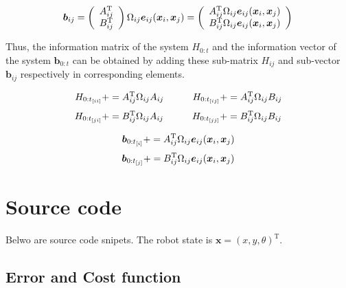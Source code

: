 \documentclass{article}
\begin{document}
\[
\bm{b}_{ij} =
\left(
  \begin{array}{cc}
    A_{ij}^{\mathrm{T}} \\
    B_{ij}^{\mathrm{T}} \\
  \end{array}
\right)
\Omega_{ij}
\bm{e}_{ij}(\bm{x}_i, \bm{x}_j)
=
\left(
  \begin{array}{cc}
    A_{ij}^{\mathrm{T}}\Omega_{ij}\bm{e}_{ij}(\bm{x}_i, \bm{x}_j) \\
    B_{ij}^{\mathrm{T}}\Omega_{ij}\bm{e}_{ij}(\bm{x}_i, \bm{x}_j) \\
  \end{array}
\right) \\
\]

Thus, the information matrix of the system $H_{0:t}$ and the information vector of the system $\bm{b}_{0:t}$ can be obtained by adding these sub-matrix $H_{ij}$ and sub-vector $\bm{b}_{ij}$ respectively in corresponding elements.

\[
H_{{0:t}_{[ii]}} += A_{ij}^{\mathrm{T}}\Omega_{ij}A_{ij} \hspace{30pt}
H_{{0:t}_{[ij]}} += A_{ij}^{\mathrm{T}}\Omega_{ij}B_{ij} \\
\]
\[
H_{{0:t}_{[ji]}} += B_{ij}^{\mathrm{T}}\Omega_{ij}A_{ij} \hspace{30pt}
H_{{0:t}_{[jj]}} += B_{ij}^{\mathrm{T}}\Omega_{ij}B_{ij} \\
\]

\[
\bm{b}_{{0:t}_{[i]}} += A_{ij}^{\mathrm{T}}\Omega_{ij}\bm{e}_{ij}(\bm{x}_i, \bm{x}_j) \\
\]
\[
\bm{b}_{{0:t}_{[j]}} += B_{ij}^{\mathrm{T}}\Omega_{ij}\bm{e}_{ij}(\bm{x}_i, \bm{x}_j) \\
\]

\newpage

\section{Source code}

Belwo are source code snipets.
The robot state is $\bm{x} = (x, y, \theta)^{\mathrm{T}}$.

\subsection{Error and Cost function}
\end{document}
